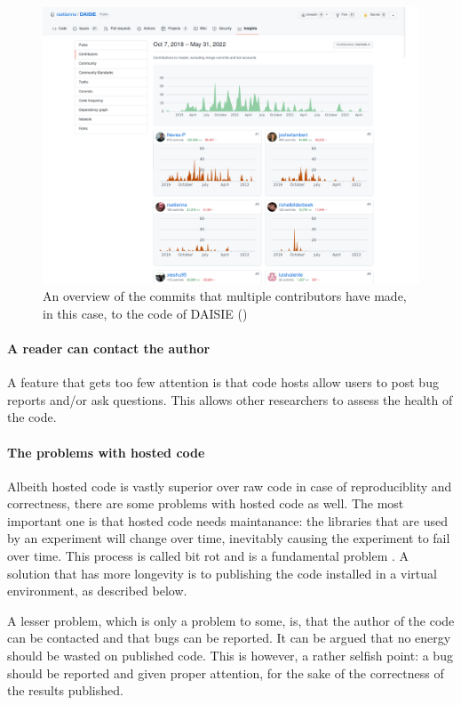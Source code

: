 \begin{figure}[!htbp]
  \centering
  \includegraphics[width=\linewidth]{daisie_contributors.png}
  \caption{
    An overview of the commits that multiple contributors have
    made, in this case, to the code of DAISIE (\cite{etienne2020daisie})
  }
  \label{fig:daisie_contributors}
\end{figure}


\paragraph{A reader can contact the author}

A feature that gets too few attention is that code hosts
allow users to post bug reports and/or ask questions.
This allows other researchers to assess the health
of the code.

\paragraph{The problems with hosted code}

Albeith hosted code is vastly superior over raw code
in case of reproduciblity and correctness,
there are some problems with hosted code as well.
The most important one is that hosted code needs maintanance:
the libraries that are used by an experiment
will change over time, inevitably causing the experiment to fail
over time. This process is called bit rot and is a fundamental
problem . A solution that has more 
longevity is to publishing the code installed in a virtual environment,
as described below.

A lesser problem, which is only a problem to some, is, that
the author of the code can be contacted and that bugs can be reported.
It can be argued that no energy should be wasted on published code.
This is however, a rather selfish point: a bug should be reported and
given proper attention, for the sake of the correctness of the 
results published. 


